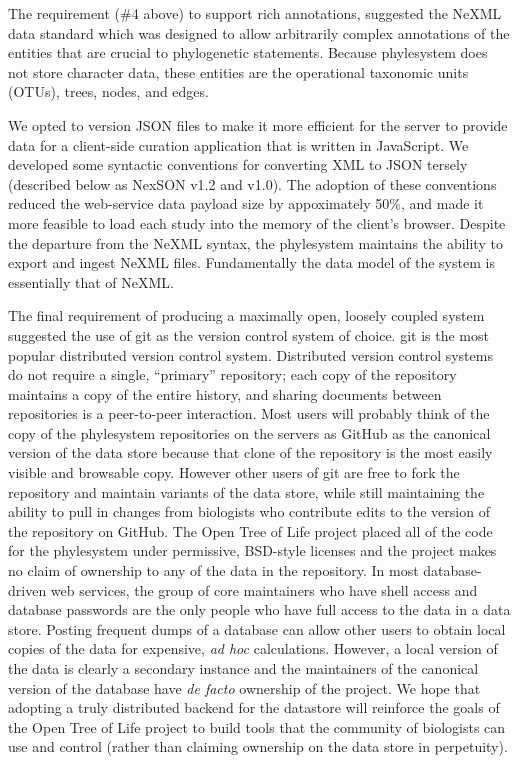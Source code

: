 \documentclass[a4paper,10pt]{article}
\newcommand{\ps}{phylesystem\xspace}
\newcommand{\otol}{Open Tree of Life\xspace}
\begin{document}
The requirement (\#4 above) to support rich annotations, suggested the NeXML data standard which was designed
    to allow arbitrarily complex annotations of the entities that are crucial to phylogenetic statements.
Because \ps does not store character data, these entities are the operational taxonomic units (OTUs), trees, nodes, and edges.

We opted to version JSON files to make it more efficient for the server to provide data for a client-side
curation application that is written in JavaScript.
We developed some syntactic conventions for converting XML to JSON tersely (described below as NexSON v1.2 and v1.0).
The adoption of these conventions reduced the web-service data payload size by appoximately 50\%, and made it more
    feasible to load each study into the memory of the client's browser.
Despite the departure from the NeXML syntax, the \ps maintains the ability to export and ingest NeXML files.
Fundamentally the data model of the system is essentially that of NeXML.

The final requirement of producing a maximally open, loosely coupled system suggested the use of git
    as the version control system of choice.
git is the most popular distributed version control system.
Distributed version control systems do not require a single, ``primary'' repository; each 
    copy of the repository maintains a copy of the entire history, and sharing documents between
    repositories is a peer-to-peer interaction.
Most users will probably think of the copy of the \ps repositories on the servers as GitHub 
    as the canonical version of the data store because that clone of the repository is the most
    easily visible and browsable copy.
However other users of git are free to fork the repository and maintain variants of the data store, while
    still maintaining the ability to pull in changes from biologists who contribute edits to the 
    version of the repository on GitHub.
The \otol project placed all of the code for the \ps under permissive, BSD-style licenses and the
    project makes no claim of ownership to any of the data in the repository.
In most database-driven web services, the group of core maintainers who have shell access and 
    database passwords are the only people who have full access to the data in a data store.
Posting frequent dumps of a database can allow other users to obtain local copies of the data 
    for expensive, {\em ad hoc} calculations.
However, a local version of the data is clearly a secondary instance and the maintainers of the 
    canonical version of the database have {\em de facto} ownership of the project.
We hope that adopting a truly distributed backend for the datastore will reinforce the goals
    of the \otol project to build tools that the community of biologists can use and control
    (rather than claiming ownership on the data store in perpetuity).
\end{document}
